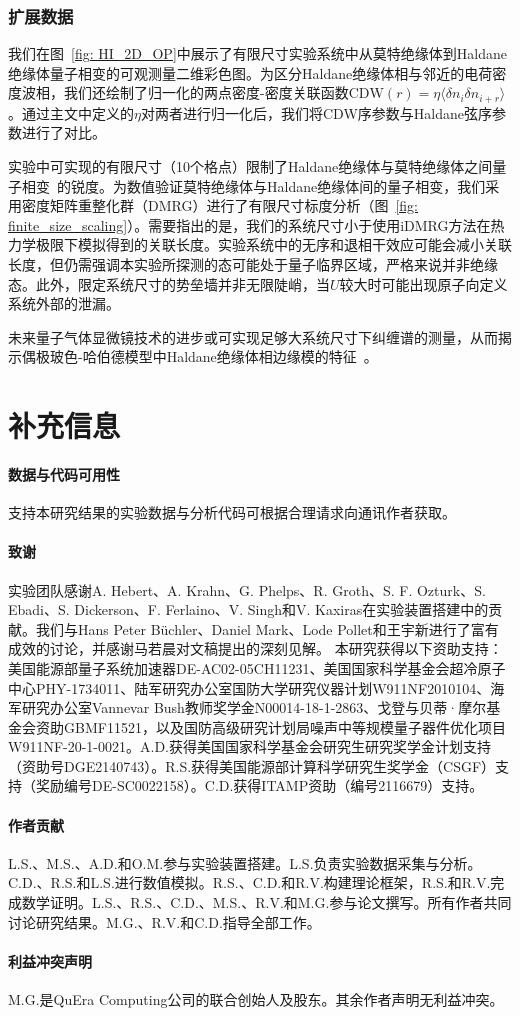 \documentclass[preprint,superscriptaddress,floatfix,nofootinbib]{revtex4-2}
\begin{document}
\subsubsection*{扩展数据}
我们在图~\ref{fig: HI_2D_OP}中展示了有限尺寸实验系统中从莫特绝缘体到Haldane绝缘体量子相变的可观测量二维彩色图。为区分Haldane绝缘体相与邻近的电荷密度波相，我们还绘制了归一化的两点密度-密度关联函数$\mathrm{CDW}(r)=\eta\langle \delta n_i \delta n_{i+r} \rangle$。通过主文中定义的$\eta$对两者进行归一化后，我们将CDW序参数与Haldane弦序参数进行了对比。

实验中可实现的有限尺寸（10个格点）限制了Haldane绝缘体与莫特绝缘体之间量子相变~\cite{Fraxanet2022}的锐度。为数值验证莫特绝缘体与Haldane绝缘体间的量子相变，我们采用密度矩阵重整化群（DMRG）进行了有限尺寸标度分析（图~\ref{fig: finite_size_scaling}）。需要指出的是，我们的系统尺寸小于使用iDMRG方法在热力学极限下模拟得到的关联长度。实验系统中的无序和退相干效应可能会减小关联长度，但仍需强调本实验所探测的态可能处于量子临界区域，严格来说并非绝缘态。此外，限定系统尺寸的势垒墙并非无限陡峭，当$U$较大时可能出现原子向定义系统外部的泄漏。

未来量子气体显微镜技术的进步或可实现足够大系统尺寸下纠缠谱的测量，从而揭示偶极玻色-哈伯德模型中Haldane绝缘体相边缘模的特征~\cite{Deng2011, Tran2023}。
\section*{补充信息}

\paragraph*{数据与代码可用性}
支持本研究结果的实验数据与分析代码可根据合理请求向通讯作者获取。

\paragraph*{致谢}
实验团队感谢A. Hebert、A. Krahn、G. Phelps、R. Groth、S. F. Ozturk、S. Ebadi、S. Dickerson、F. Ferlaino、V. Singh和V. Kaxiras在实验装置搭建中的贡献。我们与Hans Peter B\"uchler、Daniel Mark、Lode Pollet和王宇新进行了富有成效的讨论，并感谢马若晨对文稿提出的深刻见解。
本研究获得以下资助支持：美国能源部量子系统加速器DE-AC02-05CH11231、美国国家科学基金会超冷原子中心PHY-1734011、陆军研究办公室国防大学研究仪器计划W911NF2010104、海军研究办公室Vannevar Bush教师奖学金N00014-18-1-2863、戈登与贝蒂·摩尔基金会资助GBMF11521，以及国防高级研究计划局噪声中等规模量子器件优化项目W911NF-20-1-0021。A.D.获得美国国家科学基金会研究生研究奖学金计划支持（资助号DGE2140743）。R.S.获得美国能源部计算科学研究生奖学金（CSGF）支持（奖励编号DE-SC0022158）。C.D.获得ITAMP资助（编号2116679）支持。

\paragraph*{作者贡献}
L.S.、M.S.、A.D.和O.M.参与实验装置搭建。L.S.负责实验数据采集与分析。C.D.、R.S.和L.S.进行数值模拟。R.S.、C.D.和R.V.构建理论框架，R.S.和R.V.完成数学证明。L.S.、R.S.、C.D.、M.S.、R.V.和M.G.参与论文撰写。所有作者共同讨论研究结果。M.G.、R.V.和C.D.指导全部工作。

\paragraph*{利益冲突声明}
M.G.是QuEra Computing公司的联合创始人及股东。其余作者声明无利益冲突。

\nocite{*}


\end{document}
